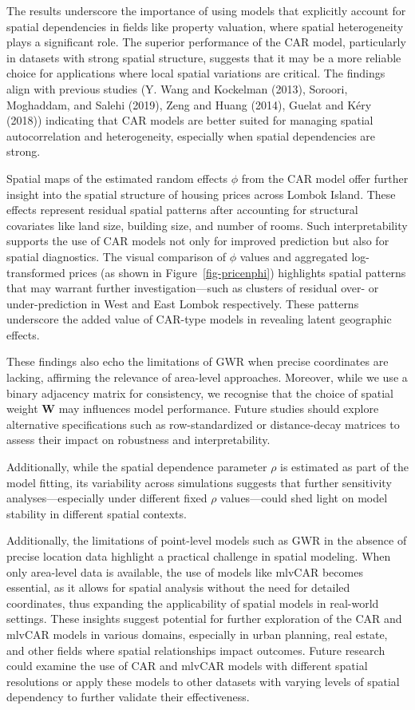\documentclass[
  default,
]{sn-jnl}
\begin{document}
The results underscore the importance of using models that explicitly
account for spatial dependencies in fields like property valuation,
where spatial heterogeneity plays a significant role. The superior
performance of the CAR model, particularly in datasets with strong
spatial structure, suggests that it may be a more reliable choice for
applications where local spatial variations are critical. The findings
align with previous studies (Y. Wang and Kockelman (2013), Soroori,
Moghaddam, and Salehi (2019), Zeng and Huang (2014), Guelat and Kéry
(2018)) indicating that CAR models are better suited for managing
spatial autocorrelation and heterogeneity, especially when spatial
dependencies are strong.

Spatial maps of the estimated random effects \(\phi\) from the CAR model
offer further insight into the spatial structure of housing prices
across Lombok Island. These effects represent residual spatial patterns
after accounting for structural covariates like land size, building
size, and number of rooms. Such interpretability supports the use of CAR
models not only for improved prediction but also for spatial
diagnostics. The visual comparison of \(\phi\) values and aggregated
log-transformed prices (as shown in Figure~\ref{fig-pricenphi})
highlights spatial patterns that may warrant further
investigation---such as clusters of residual over- or under-prediction
in West and East Lombok respectively. These patterns underscore the
added value of CAR-type models in revealing latent geographic effects.

These findings also echo the limitations of GWR when precise coordinates
are lacking, affirming the relevance of area-level approaches. Moreover,
while we use a binary adjacency matrix for consistency, we recognise
that the choice of spatial weight \(\mathbf{W}\) may influences model
performance. Future studies should explore alternative specifications
such as row-standardized or distance-decay matrices to assess their
impact on robustness and interpretability.

Additionally, while the spatial dependence parameter \(\rho\) is
estimated as part of the model fitting, its variability across
simulations suggests that further sensitivity analyses---especially
under different fixed \(\rho\) values---could shed light on model
stability in different spatial contexts.

Additionally, the limitations of point-level models such as GWR in the
absence of precise location data highlight a practical challenge in
spatial modeling. When only area-level data is available, the use of
models like mlvCAR becomes essential, as it allows for spatial analysis
without the need for detailed coordinates, thus expanding the
applicability of spatial models in real-world settings. These insights
suggest potential for further exploration of the CAR and mlvCAR models
in various domains, especially in urban planning, real estate, and other
fields where spatial relationships impact outcomes. Future research
could examine the use of CAR and mlvCAR models with different spatial
resolutions or apply these models to other datasets with varying levels
of spatial dependency to further validate their effectiveness.
\end{document}
